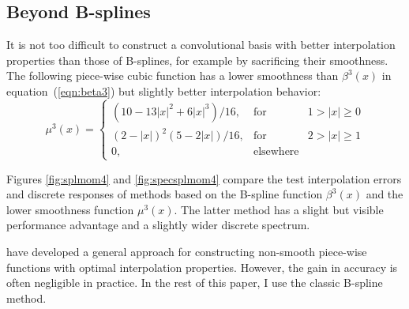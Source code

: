 


\subsection{Beyond B-splines}

It is not too difficult to construct a convolutional basis with better
interpolation properties than those of B-splines, for example by
sacrificing their smoothness. The following piece-wise cubic function
has a lower smoothness than $\beta^3(x)$ in equation~(\ref{eqn:beta3})
but slightly better interpolation behavior:
\begin{equation}
  \label{eqn:mu3}
  \mu^3(x) = \left\{\begin{array}{lcr}
\displaystyle \left(10-13 |x|^2+6 |x|^3\right)/16, & 
\mbox{for} & 1 > |x| \geq 0 \\
\displaystyle (2-|x|)^2 (5-2 |x|)/16, & \mbox{for} & 2 > |x| \geq 1 \\
0, & \mbox{elsewhere} &
\end{array}\right.
\end{equation}
\par
Figures \ref{fig:splmom4} and \ref{fig:specsplmom4} compare the test
interpolation errors and discrete responses of methods based on the
B-spline function $\beta^3(x)$ and the lower smoothness function
$\mu^3(x)$. The latter method has a slight but visible performance
advantage and a slightly wider discrete spectrum.

\par
{} have developed a general approach for constructing
non-smooth piece-wise functions with optimal interpolation properties.
However, the gain in accuracy is often negligible in practice. In the
rest of this paper, I use the classic B-spline method.

